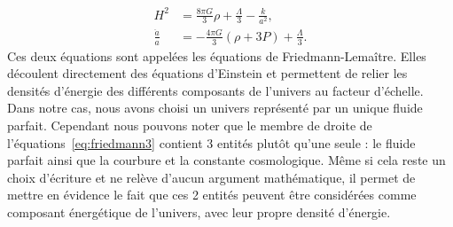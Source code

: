 \documentclass[11pt, twoside, a4paper, openright]{report}
\begin{document}
\begin{align}
  \label{eq:friedmann3}
  H^2 &= \frac{8 \pi G}{3} \rho + \frac{\Lambda}{3} - \frac{k}{a^2} ,\\
  \label{eq:friedmann4}
  \frac{\ddot{a}}{a} &= - \frac{4 \pi G}{3} (\rho + 3 P) + \frac{\Lambda}{3} .
\end{align}
Ces deux équations sont appelées les équations de Friedmann-Lemaître. Elles découlent directement des équations d'Einstein et permettent de relier les densités d'énergie des différents composants de l'univers au facteur d'échelle. Dans notre cas, nous avons choisi un univers représenté par un unique fluide parfait. Cependant nous pouvons noter que le membre de droite de l'équations~\ref{eq:friedmann3} contient 3 entités plutôt qu'une seule : le fluide parfait ainsi que la courbure et la constante cosmologique. Même si cela reste un choix d'écriture et ne relève d'aucun argument mathématique, il permet de mettre en évidence le fait que ces 2 entités peuvent être considérées comme composant énergétique de l'univers, avec leur propre densité d'énergie.
\end{document}
